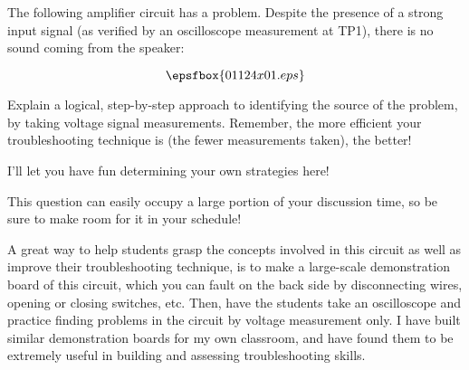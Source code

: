 

The following amplifier circuit has a problem.  Despite the presence of a strong input signal (as verified by an oscilloscope measurement at TP1), there is no sound coming from the speaker:

$$\epsfbox{01124x01.eps}$$

\vskip 10pt

Explain a logical, step-by-step approach to identifying the source of the problem, by taking voltage signal measurements.  Remember, the more efficient your troubleshooting technique is (the fewer measurements taken), the better!







I'll let you have fun determining your own strategies here!







This question can easily occupy a large portion of your discussion time, so be sure to make room for it in your schedule!

A great way to help students grasp the concepts involved in this circuit as well as improve their troubleshooting technique, is to make a large-scale demonstration board of this circuit, which you can fault on the back side by disconnecting wires, opening or closing switches, etc.  Then, have the students take an oscilloscope and practice finding problems in the circuit by voltage measurement only.  I have built similar demonstration boards for my own classroom, and have found them to be extremely useful in building and assessing troubleshooting skills.




